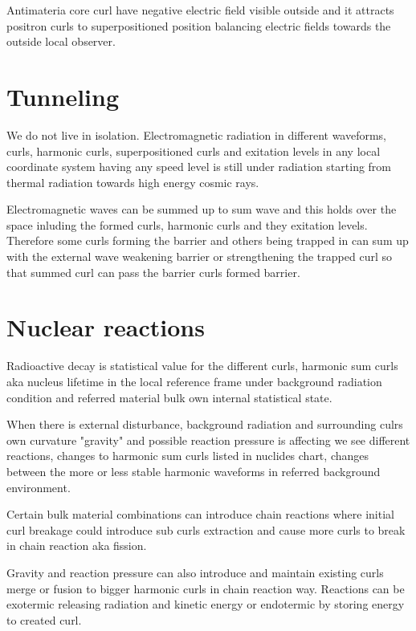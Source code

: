 Antimateria core curl have negative electric field visible outside and it
attracts positron curls to superpositioned position balancing electric fields
towards the outside local observer.

\section{Tunneling}
\label{tunneling}

We do not live in isolation. Electromagnetic radiation in different waveforms,
curls, harmonic curls, superpositioned curls and exitation levels in any local
coordinate system having any speed level is still under radiation starting
from thermal radiation towards high energy cosmic rays.

Electromagnetic waves can be summed up to sum wave and this holds over the
space inluding the formed curls, harmonic curls and they exitation levels.
Therefore some curls forming the barrier and others being trapped in can sum
up with the external wave weakening barrier or strengthening the trapped curl
so that summed curl can pass the barrier curls formed barrier.

\section{Nuclear reactions}
\label{nuclear_reaction}

Radioactive decay is statistical value for the different curls, harmonic sum
curls aka nucleus lifetime in the local reference frame under background
radiation condition and referred material bulk own internal statistical state.

When there is external disturbance, background radiation and surrounding culrs
own curvature "gravity" and possible reaction pressure is affecting we see
different reactions, changes to harmonic sum curls listed in nuclides
chart\cite{Nuclides}, changes between the more or less stable harmonic
waveforms in referred background environment.

Certain bulk material combinations can introduce chain reactions where initial
curl breakage could introduce sub curls extraction and cause more curls to
break in chain reaction aka fission.

Gravity and reaction pressure can also introduce and maintain existing curls
merge or fusion to bigger harmonic curls in chain reaction way. Reactions can
be exotermic releasing radiation and kinetic energy or endotermic by storing
energy to created curl.

